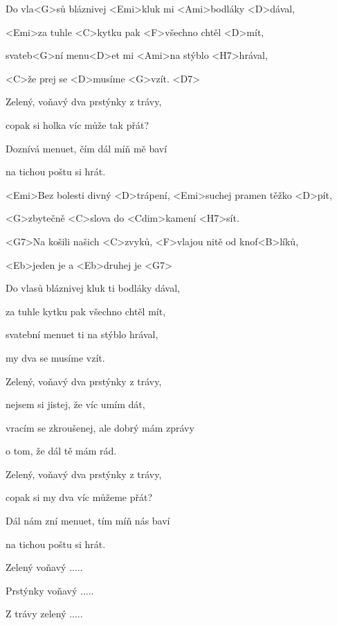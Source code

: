 

\zs
Do vla<G>sů bláznivej <Emi>kluk mi <Ami>bodláky <D>dával, 

<Emi>za tuhle <C>kytku pak <F>všechno chtěl <D>mít,

svateb<G>ní menu<D>et mi <Ami>na stýblo <H7>hrával, 

<C>že prej se <D>musíme <G>vzít. <D7>
\ks

\zs
Zelený, voňavý dva prstýnky z trávy,

copak si holka víc může tak přát?

Doznívá menuet, čím dál míň mě baví

na tichou poštu si hrát.
\ks

\zr
<Emi>Bez bolesti divný <D>trápení, <Emi>suchej pramen těžko <D>pít,

<G>zbytečně <C>slova do <Cdim>kamení <H7>sít.

<G7>Na košili našich <C>zvyků, <F>vlajou nitě od 
knof<B>líků,

<Eb>jeden je  a <Eb>druhej je  <G7>
\kr

\zs
Do vlasů bláznivej kluk ti bodláky dával,

za tuhle kytku pak všechno chtěl mít,

svatební menuet ti na stýblo hrával,

my dva se musíme vzít.
\ks

\zs
Zelený, voňavý dva prstýnky z trávy,

nejsem si jistej, že víc umím dát,

vracím se zkroušenej, ale dobrý mám zprávy

o tom, že dál tě mám rád.
\ks

\zs
Zelený, voňavý dva prstýnky z trávy,

copak si my dva víc můžeme přát?

Dál nám zní menuet, tím míň nás baví

na tichou poštu si hrát.



Zelený voňavý .....

Prstýnky voňavý .....

Z trávy zelený ..... 
\ks
\kp

